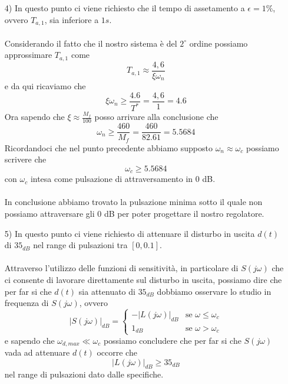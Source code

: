 \documentclass[a4paper, 11pt]{article}
\begin{document}
\begin{itemize}
    \item[4)] In questo punto ci viene richiesto che il tempo di assetamento a $\epsilon = 1 \%$, ovvero $T_{a,1}$, sia inferiore a $1s$.
    \\
    \\
    Considerando il fatto che il nostro sistema è del $2^{\circ}$ ordine possiamo approssimare $T_{a,1}$ come
    \begin{equation*}
        T_{a,1} \approx \frac{4,6}{\xi \omega_n}
    \end{equation*}
    e da qui ricaviamo che 
    \begin{equation*}
        \xi \omega_n \ge \frac{4.6}{T^*} = \frac{4,6}{1} = 4.6
    \end{equation*}
    Ora sapendo che $\xi \approx \frac{M_f}{100}$ posso arrivare alla conclusione che 
    \begin{equation*}
        \omega_n \ge \frac{460}{M_f} = \frac{460}{82.61} = 5.5684
    \end{equation*}
    Ricordandoci che nel punto precedente abbiamo supposto $\omega_n \approx \omega_c$ possiamo scrivere che
    \begin{equation*}
        \omega_c \ge 5.5684
    \end{equation*}
    con $\omega_c$ intesa come pulsazione di attraversamento in 0 dB.
    \\
    \\
    In conclusione abbiamo trovato la pulsazione minima sotto il quale non possiamo attraversare gli 0 dB per poter progettare il nostro regolatore.

    \item[5)] In questo punto ci viene richiesto di attenuare il disturbo in uscita $d(t)$ di $35_{dB}$ nel range di pulsazioni tra $[0, 0.1]$.
    \\
    \\
    Attraverso l'utilizzo delle funzioni di sensitività, in particolare di $S(j\omega)$ che ci consente di lavorare direttamente sul disturbo in uscita, possiamo dire che per far si che $d(t)$ sia attenuato di $35_{dB}$ dobbiamo osservare lo studio in frequenza di $S(j\omega)$, ovvero
    \begin{equation*}
        |S(j\omega)|_{dB} =
        \begin{cases}
            -|L(j\omega)|_{dB} & \text{se $\omega \le \omega_c$} \\
            1_{dB} & \text{se $\omega > \omega_c$}
        \end{cases}
    \end{equation*}
    e sapendo che $\omega_{d,max} \ll \omega_c$ possiamo concludere che per far si che $S(j\omega)$ vada ad attenuare $d(t)$ occorre che
    \begin{equation*}
        |L(j\omega)|_{dB} \ge 35_{dB}
    \end{equation*}
    nel range di pulsazioni dato dalle specifiche.


\end{itemize}
\end{document}
